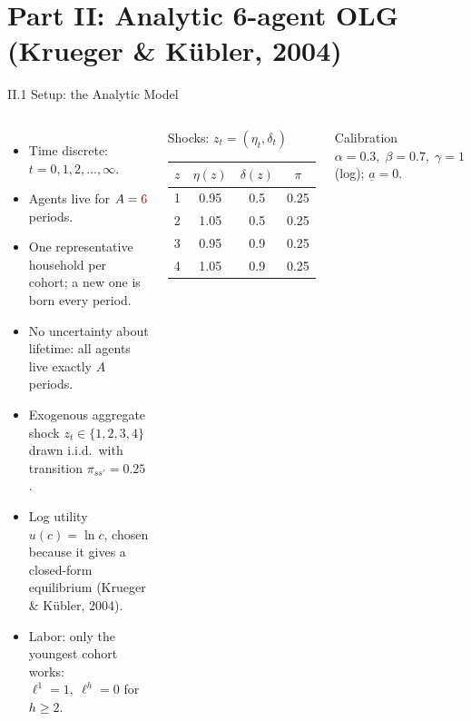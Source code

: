 \documentclass[aspectratio=169,11pt]{beamer}
\newcommand{\emphc}[1]{\textcolor{harvardcrimson}{#1}}
\begin{document}

\section{Part II: Analytic 6-agent OLG (Krueger \& K\"ubler, 2004)}

\begin{frame}{II.1 Setup: the Analytic Model}
\footnotesize
\begin{columns}[T]
\begin{itemize}\itemsep1pt
    \item Time discrete: $t = 0, 1, 2, \ldots, \infty$.
    \item Agents live for $A = \emphc{6}$ periods.
    \item \emphc{One representative household per cohort}; a new one is born every period.
    \item \emphc{No uncertainty about lifetime}: all agents live exactly $A$ periods.
    \item Exogenous aggregate shock $z_t \in \{1,2,3,4\}$ drawn \emphc{i.i.d.}\ with transition $\pi_{ss'} = 0.25$.
    \item \emphc{Log utility} $u(c) = \ln c$, chosen because it gives a \emphc{closed-form} equilibrium (Krueger \& K\"ubler, 2004).
    \item \emphc{Labor:} only the youngest cohort works: $\ell^1 = 1,\ \ell^h = 0$ for $h \ge 2$.
\end{itemize}

\begin{block}{Shocks: $z_t = (\eta_t, \delta_t)$}
{\scriptsize\renewcommand{\arraystretch}{0.95}
\begin{tabular}{cccc}
\toprule
$z$ & $\eta(z)$ & $\delta(z)$ & $\pi$\\
\midrule
1 & 0.95 & 0.5 & 0.25\\
2 & 1.05 & 0.5 & 0.25\\
3 & 0.95 & 0.9 & 0.25\\
4 & 1.05 & 0.9 & 0.25\\
\bottomrule
\end{tabular}}
\end{block}

\begin{block}{Calibration}
{\scriptsize $\alpha = 0.3,\;\beta = 0.7,\;\gamma = 1$ (log); $\underline{a}=0$.}
\end{block}
\end{columns}
\end{frame}
\end{document}
